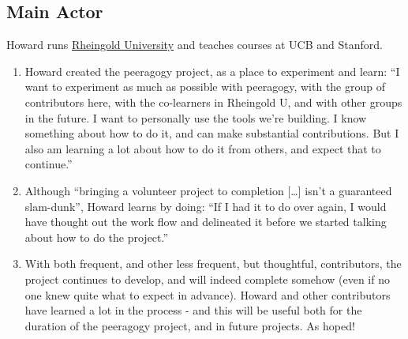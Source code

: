 \subsection{Main Actor}

Howard runs \href{http://www.rheingold.com/university/}{Rheingold
University} and teaches courses at UCB and Stanford.

\begin{enumerate}
\item
  Howard created the peeragogy project, as a place to experiment and
  learn: ``I want to experiment as much as possible with peeragogy, with
  the group of contributors here, with the co-learners in Rheingold U,
  and with other groups in the future. I want to personally use the
  tools we're building. I know something about how to do it, and can
  make substantial contributions. But I also am learning a lot about how
  to do it from others, and expect that to continue.''
\item
  Although ``bringing a volunteer project to completion {[}\ldots{}{]}
  isn't a guaranteed slam-dunk'', Howard learns by doing: ``If I had it
  to do over again, I would have thought out the work flow and
  delineated it before we started talking about how to do the project.''
\item
  With both frequent, and other less frequent, but thoughtful,
  contributors, the project continues to develop, and will indeed
  complete somehow (even if no one knew quite what to expect in
  advance). Howard and other contributors have learned a lot in the
  process - and this will be useful both for the duration of the
  peeragogy project, and in future projects. As hoped!
\end{enumerate}
